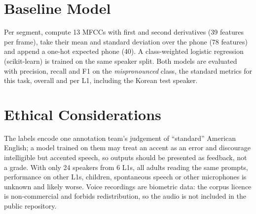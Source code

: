 \documentclass[final]{article}
\begin{document}
\section*{Baseline Model}
Per segment, compute 13 MFCCs with first and second derivatives (39 features per frame), take their mean and
standard deviation over the phone (78 features) and append a one-hot expected phone (40). A class-weighted
logistic regression (scikit-learn) is trained on the same speaker split. Both models are evaluated with
precision, recall and F1 on the \emph{mispronounced} class, the standard metrics for this task, overall and
per L1, including the Korean test speaker.

\section*{Ethical Considerations}
The labels encode one annotation team's judgement of ``standard'' American English; a model trained on them may
treat an accent as an error and discourage intelligible but accented speech, so outputs should be presented as
feedback, not a grade. With only 24 speakers from 6 L1s, all adults reading the same prompts, performance on
other L1s, children, spontaneous speech or other microphones is unknown and likely worse. Voice recordings are
biometric data: the corpus licence is non-commercial and forbids redistribution, so the audio is not included
in the public repository.

\newpage


\end{document}
